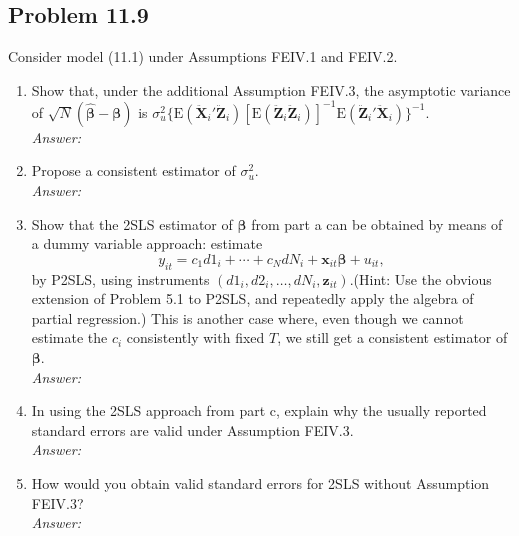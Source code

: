 \documentclass[10pt]{article}
\newcommand{\E}{\text{E}}
\begin{document}
\subsection*{Problem 11.9}
Consider model (11.1) under Assumptions FEIV.1 and FEIV.2.
\begin{enumerate}[label=\alph*.]
\item Show that, under the additional Assumption FEIV.3, the asymptotic variance of $\sqrt{N}(\hat{\pmb{\beta}}-{\pmb{\beta}})$ is $\sigma_u^2\{\E(\ddot{\textbf{X}}_i'\ddot{\textbf{Z}}_i)[\E(\ddot{\textbf{Z}}_i\ddot{\textbf{Z}}_i)]^{-1}\E(\ddot{\textbf{Z}}_i'\ddot{\textbf{X}}_i)\}^{-1}$.
\\ \textit{Answer:}\\

\item Propose a consistent estimator of $\sigma_u^2$.
\\ \textit{Answer:}\\

\item Show that the 2SLS estimator of $\pmb{\beta}$ from part a can be obtained by means of a dummy variable approach: estimate
\[y_{it}=c_1d1_i+\cdots+c_NdN_i+\textbf{x}_{it}\pmb{\beta}+u_{it},\]
by P2SLS, using instruments $(d1_i,d2_i,\ldots,dN_i,\textbf{z}_{it})$.(Hint: Use the obvious extension of Problem 5.1 to P2SLS, and repeatedly apply the algebra of partial regression.) This is another case where, even though we cannot estimate the $c_i$ consistently with fixed $T$, we still get a consistent estimator of $\pmb{\beta}$.
\\ \textit{Answer:}\\

\item In using the 2SLS approach from part c, explain why the usually reported standard errors are valid under Assumption FEIV.3.
\\\textit{Answer:}\\

\item How would you obtain valid standard errors for 2SLS without Assumption FEIV.3?
\\\textit{Answer:}\\
\end{enumerate}
\end{document}
